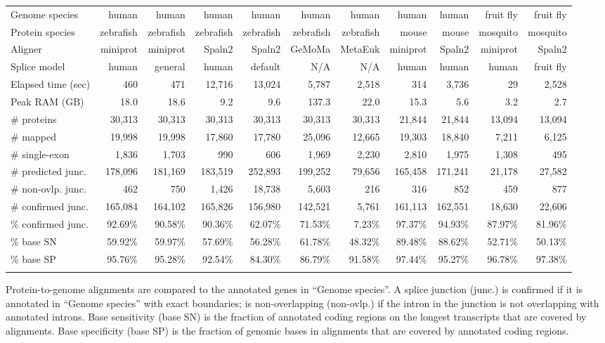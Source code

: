 \documentclass{bioinfo}
\begin{document}
\begin{table*}[!tb]
{\label{tab:eval}
\begin{tabular*}{\textwidth}{@{\extracolsep{\fill}}lrrrrrrrrrr}
\toprule
Genome species     & human   & human   & human   & human   & human   & human   & human   & human   &fruit fly&fruit fly \\
Protein species    &zebrafish&zebrafish&zebrafish&zebrafish&zebrafish&zebrafish& mouse   & mouse   & mosquito& mosquito \\
Aligner            & miniprot& miniprot& Spaln2  & Spaln2  &  GeMoMa & MetaEuk & miniprot& Spaln2  & miniprot& Spaln2 \\
Splice model       & human   & general & human   & default &     N/A &     N/A & human   & human   & human   &fruit fly \\
\midrule
Elapsed time (sec) &     460 &     471 &  12,716 &  13,024 &   5,787 &   2,518 &     314 &   3,736 &      29 &   2,528 \\
Peak RAM (GB)      &    18.0 &    18.6 &     9.2 &     9.6 &   137.3 &    22.0 &    15.3 &     5.6 &     3.2 &     2.7 \\
\# proteins        &  30,313 &  30,313 &  30,313 &  30,313 &  30,313 &  30,313 &  21,844 &  21,844 &  13,094 &  13,094 \\
\# mapped          &  19,998 &  19,998 &  17,860 &  17,780 &  25,096 &  12,665 &  19,303 &  18,840 &   7,211 &   6,125 \\
\# single-exon     &   1,836 &   1,703 &     990 &     606 &   1,969 &   2,230 &   2,810 &   1,975 &   1,308 &     495 \\
\# predicted junc. & 178,096 & 181,169 & 183,519 & 252,893 & 199,252 &  79,656 & 165,458 & 171,241 &  21,178 &  27,582 \\
\# non-ovlp. junc. &     462 &     750 &   1,426 &  18,738 &   5,603 &     216 &     316 &     852 &     459 &     877 \\
\# confirmed junc. & 165,084 & 164,102 & 165,826 & 156,980 & 142,521 &   5,761 & 161,113 & 162,551 &  18,630 &  22,606 \\
\% confirmed junc. & 92.69\% & 90.58\% & 90.36\% & 62.07\% & 71.53\% &  7.23\% & 97.37\% & 94.93\% & 87.97\% & 81.96\% \\
\% base SN         & 59.92\% & 59.97\% & 57.69\% & 56.28\% & 61.78\% & 48.32\% & 89.48\% & 88.62\% & 52.71\% & 50.13\% \\
\% base SP         & 95.76\% & 95.28\% & 92.54\% & 84.30\% & 86.79\% & 91.58\% & 97.44\% & 95.27\% & 96.78\% & 97.38\% \\
\botrule
\end{tabular*}
}{Protein-to-genome alignments are compared to the annotated genes in ``Genome
species''. A splice junction (junc.) is confirmed if it is annotated in
``Genome species'' with exact boundaries; is non-overlapping (non-ovlp.) if the
intron in the junction is not overlapping with annotated introns. Base
sensitivity (base SN) is the fraction of annotated coding regions on the
longest transcripts that are covered by alignments. Base specificity (base SP)
is the fraction of genomic bases in alignments that are covered by annotated
coding regions.}
\end{table*}
\end{document}
